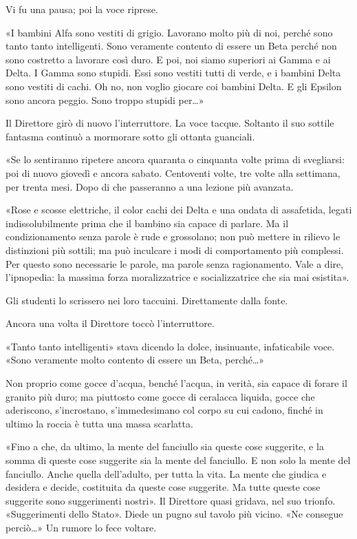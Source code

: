 \documentclass[
a5paper, %
10pt, %
twoside, 
onecolumn, %
openany, %
]{memoir}
\begin{document}
Vi fu una pausa; poi la voce riprese.

«I bambini Alfa sono vestiti di grigio. Lavorano molto più di noi, perché sono tanto tanto intelligenti. Sono veramente contento di essere un Beta perché non sono costretto a lavorare così duro. E poi, noi siamo superiori ai Gamma e ai Delta. I Gamma sono stupidi. Essi sono vestiti tutti di verde, e i bambini Delta sono vestiti di cachi. Oh no, non voglio giocare coi bambini Delta. E gli Epsilon sono ancora peggio. Sono troppo stupidi per…»

Il Direttore girò di nuovo l’interruttore. La voce tacque. Soltanto il suo sottile fantasma continuò a mormorare sotto gli ottanta guanciali.

«Se lo sentiranno ripetere ancora quaranta o cinquanta volte prima di svegliarsi: poi di nuovo giovedì e ancora sabato. Centoventi volte, tre volte alla settimana, per trenta mesi. Dopo di che passeranno a una lezione più avanzata.

«Rose e scosse elettriche, il color cachi dei Delta e una ondata di assafetida, legati indissolubilmente prima che il bambino sia capace di parlare. Ma il condizionamento senza parole è rude e grossolano; non può mettere in rilievo le distinzioni più sottili; ma può inculcare i modi di comportamento più complessi. Per questo sono necessarie le parole, ma parole senza ragionamento. Vale a dire, l’ipnopedia: la massima forza moralizzatrice e socializzatrice che sia mai esistita».

Gli studenti lo scrissero nei loro taccuini. Direttamente dalla fonte.

Ancora una volta il Direttore toccò l’interruttore.

«Tanto tanto intelligenti» stava dicendo la dolce, insinuante, infaticabile voce. «Sono veramente molto contento di essere un Beta, perché…»

Non proprio come gocce d’acqua, benché l’acqua, in verità, sia capace di forare il granito più duro; ma piuttosto come gocce di ceralacca liquida, gocce che aderiscono, s’incrostano, s’immedesimano col corpo su cui cadono, finché in ultimo la roccia è tutta una massa scarlatta.

«Fino a che, da ultimo, la mente del fanciullo sia queste cose suggerite, e la somma di queste cose suggerite sia la mente del fanciullo. E non solo la mente del fanciullo. Anche quella dell’adulto, per tutta la vita. La mente che giudica e desidera e decide, costituita da queste cose suggerite. Ma tutte queste cose suggerite sono suggerimenti nostri». Il Direttore quasi gridava, nel suo trionfo. «Suggerimenti dello Stato». Diede un pugno sul tavolo più vicino. «Ne consegue perciò…» Un rumore lo fece voltare.
\end{document}
